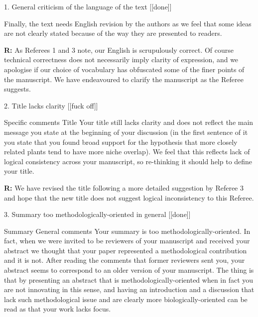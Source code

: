 \documentclass[12pt]{letter}
\newenvironment{refquote}{\bigskip \begin{it}}{\end{it}\smallskip}
\begin{document}
	1. General criticism of the language of the text [[done]]

		\begin{refquote}

		Finally, the text needs English revision by the authors as we feel that some ideas are not clearly stated because of the way they are presented to readers. 

		\end{refquote}


		\textbf{R:} As Referees 1 and 3 note, our English is scrupulously correct. Of course technical correctness does not necessarily imply clarity of expression, and we apologise if our choice of vocabulary has obfuscated some of the finer points of the manuscript. We have endeavoured to clarify the manuscript as the Referee suggests.


	2. Title lacks clarity [[fuck off]]

		\begin{refquote}
		Specific comments
		Title
		Your title still lacks clarity and does not reflect the main message you state at the beginning of your discussion (in the first sentence of it you state that you found broad support for the hypothesis that more closely related plants tend to have more niche overlap). We feel that this reflects lack of logical consistency across your manuscript, so re-thinking it should help to define your title.
		\end{refquote}

		\textbf{R:} We have revised the title following a more detailed suggestion by Referee 3 and hope that the new title does not suggest logical inconsistency to this Referee.


	3. Summary too methodologically-oriented in general [[done]]

		\begin{refquote}
			Summary
			General comments
			Your summary is too methodologically-oriented. In fact, when we were invited to be reviewers of your manuscript and received your abstract we thought that your paper represented a methodological contribution and it is not. After reading the comments that former reviewers sent you, your abstract seems to correspond to an older version of your manuscript. The thing is that by presenting an abstract that is methodologically-oriented when in fact you are not innovating in this sense, and having an introduction and a discussion that lack such methodological issue and are clearly more biologically-oriented can be read as that your work lacks focus.
		\end{refquote}
\end{document}
